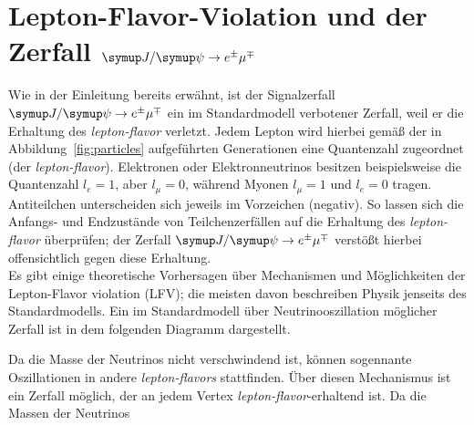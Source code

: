 \section{\texorpdfstring{Lepton-Flavor-Violation und der Zerfall $\signal$}{Jpsi to eµ}}
%
Wie in der Einleitung bereits erwähnt, ist der Signalzerfall $\signal$ ein im Standardmodell verbotener Zerfall,
weil er die Erhaltung des \textit{lepton-flavor} verletzt. Jedem Lepton wird hierbei gemäß der in Abbildung~\ref{fig:particles}
aufgeführten Generationen eine Quantenzahl zugeordnet (der \textit{lepton-flavor}). Elektronen oder Elektronneutrinos besitzen
beispielsweise die Quantenzahl $l_e=1$, aber $l_\mu=0$, während Myonen $l_\mu=1$ und $l_e=0$ tragen. Antiteilchen unterscheiden
sich jeweils im Vorzeichen (negativ). So lassen sich die Anfangs- und Endzustände von Teilchenzerfällen auf die Erhaltung des
\textit{lepton-flavor} überprüfen; der Zerfall $\signal$ verstößt hierbei offensichtlich gegen diese Erhaltung.\\
%
Es gibt einige theoretische Vorhersagen über Mechanismen und Möglichkeiten der Lepton-Flavor violation (LFV); die meisten davon
beschreiben Physik jenseits des Standardmodells. Ein im Standardmodell über Neutrinooszillation möglicher Zerfall ist in dem
folgenden Diagramm dargestellt.
%
\begin{figure}[H]
  \centering
  \label{fig:lfv_nu}
\end{figure}
%
Da die Masse der Neutrinos nicht verschwindend ist, können sogennante Oszillationen in andere \textit{lepton-flavors} stattfinden.
Über diesen Mechanismus ist ein Zerfall möglich, der an jedem Vertex \textit{lepton-flavor}-erhaltend ist. Da die Massen der Neutrinos
